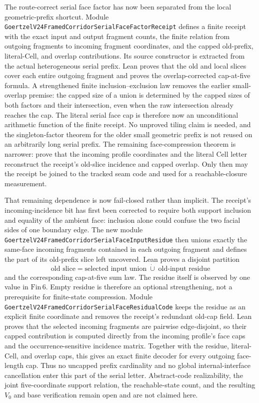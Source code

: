 \documentclass[11pt]{article}
\theoremstyle{definition}
\begin{document}
The route-correct serial face factor has now been separated from the local
geometric-prefix shortcut.  Module
\texttt{GoertzelV24FramedCorridorSerialFaceFactorReceipt} defines a finite
receipt with the exact input and output fragment counts, the finite relation
from outgoing fragments to incoming fragment coordinates, and the capped
old-prefix, literal-Cell, and overlap contributions.  Its source constructor
is extracted from the actual heterogeneous serial prefix.  Lean proves that
the old and local slices cover each entire outgoing fragment and proves the
overlap-corrected cap-at-five formula.  A strengthened finite
inclusion--exclusion law removes the earlier small-overlap premise: the capped
size of a union is determined by the capped sizes of both factors and their
intersection, even when the raw intersection already reaches the cap.  The
literal serial face cap is therefore now an unconditional arithmetic function
of the finite receipt.  No unproved tiling claim is needed, and the
singleton-factor theorem for the older small geometric prefix is not reused
on an arbitrarily long serial prefix.  The remaining face-compression theorem
is narrower: prove that the incoming profile coordinates and the literal Cell
letter reconstruct the receipt's old-slice incidence and capped overlap.
Only then may the receipt be joined to the tracked seam code and used for a
reachable-closure measurement.

That remaining dependence is now fail-closed rather than implicit.  The
receipt's incoming-incidence bit has first been corrected to require both
support inclusion and equality of the ambient face: inclusion alone could
confuse the two facial sides of one boundary edge.  The new module
\texttt{GoertzelV24FramedCorridorSerialFaceInputResidue} then unions exactly
the same-face incoming fragments contained in each outgoing fragment and
defines the part of its old-prefix slice left uncovered.  Lean proves a
disjoint partition
\[
  \text{old slice}=\text{selected input union}\;\dot\cup\;
  \text{old-input residue}
\]
and the corresponding cap-at-five sum law.  The residue itself is observed by
one value in $\mathrm{Fin}\,6$.  Empty residue is therefore an optional
strengthening, not a prerequisite for finite-state compression.  Module
\texttt{GoertzelV24FramedCorridorSerialFaceResidualCode} keeps the residue as
an explicit finite coordinate and removes the receipt's redundant old-cap
field.  Lean proves that the selected incoming fragments are pairwise
edge-disjoint, so their capped contribution is computed directly from the
incoming profile's face caps and the occurrence-sensitive incidence matrix.
Together with the residue, literal-Cell, and overlap caps, this gives an exact
finite decoder for every outgoing face-length cap.  Thus no uncapped prefix
cardinality and no global internal-interface cancellation enter this part of
the serial letter.  Abstract-code realizability, the joint five-coordinate
support relation, the reachable-state count, and the resulting $V_0$ and base
verification remain open and are not claimed here.
\end{document}
